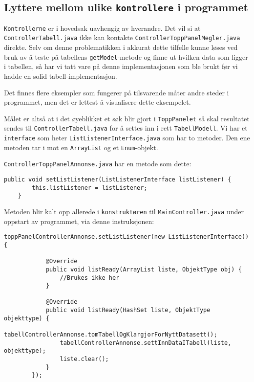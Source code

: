 \subsection{Lyttere mellom ulike \texttt{kontrollere} i programmet} \label{sec:kontrollerlyttere}

\texttt{Kontrollerne} er i hovedsak uavhengig av hverandre. Det vil si at \texttt{ControllerTabell.java} ikke kan kontakte \texttt{ControllerToppPanelMegler.java} direkte. Selv om denne problematikken i akkurat dette tilfelle kunne løses ved bruk av å teste på tabellens \texttt{getModel}-metode og finne ut hvilken data som ligger i tabellen, så har vi tatt vare på denne implementasjonen som ble brukt før vi hadde en solid tabell-implementasjon.

Det finnes flere eksempler som fungerer på tilsvarende måter andre steder i programmet, men det er lettest å visualisere dette eksempelet.

Målet er altså at i det øyeblikket et søk blir gjort i \texttt{ToppPanelet} så skal resultatet sendes til \texttt{ControllerTabell.java} for å settes inn i rett \texttt{TabellModell}.
Vi har et \texttt{interface} som heter \texttt{ListListenerInterface.java} som har to metoder. Den ene metoden tar i mot en \texttt{ArrayList} og et \texttt{Enum}-objekt.

\texttt{ControllerToppPanelAnnonse.java} har en metode som dette:

\begin{lstlisting}[caption=Kodesnutt nummer 1: \texttt{setListListener}-metoden fra \texttt{ControllerToppPanelAnnonse.java}]
    public void setListListener(ListListenerInterface listListener) {
        this.listListener = listListener;
    }
\end{lstlisting}

Metoden blir kalt opp allerede i \texttt{konstruktøren} til \texttt{MainController.java} under oppstart av programmet, via denne instruksjonen:

\begin{lstlisting}[caption=Kodesnutt nummer 2: Setter lytter fra \texttt{MainController.java}]
        toppPanelControllerAnnonse.setListListener(new ListListenerInterface() {

            @Override
            public void listReady(ArrayList liste, ObjektType obj) {
                //Brukes ikke her
            }

            @Override
            public void listReady(HashSet liste, ObjektType objekttype) {
                tabellControllerAnnonse.tomTabellOgKlargjorForNyttDatasett();
                tabellControllerAnnonse.settInnDataITabell(liste, objekttype);
                liste.clear();
            }
        });
\end{lstlisting}

